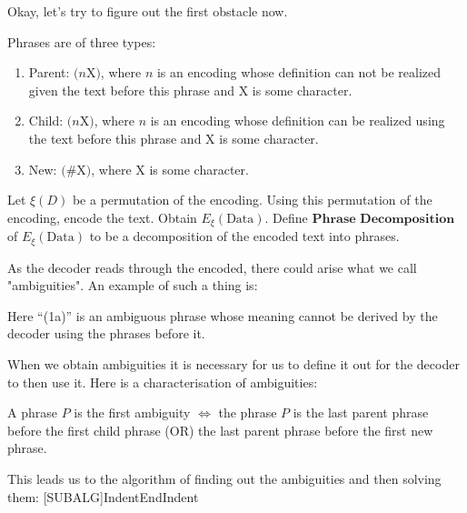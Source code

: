 \documentclass[scrartcl]{article}
\begin{document}
Okay, let's try to figure out the first obstacle now. 
\begin{definition*}[Phrase]
    Phrases are of three types:
    \begin{enumerate}
        \item Parent: $\text{(}n\text{X)}$, where $n$ is an encoding whose definition can not be realized given the text before this phrase and $\text{X}$ is some character.
        \item Child: $\text{(}n\text{X)}$, where $n$ is an encoding whose definition can be realized using the text before this phrase and $\text{X}$ is some character.
        \item New: $\text{(\#X)}$, where $\text{X}$ is some character.
    \end{enumerate}
\end{definition*}
\begin{proposition*}
    Let $\xi(D)$ be a permutation of the encoding. Using this permutation of the encoding, encode the text. Obtain $E_{\xi}(\text{Data})$. Define 
    $\textbf{Phrase Decomposition}$ of $E_{\xi}(\text{Data})$ to be a decomposition of the encoded text into phrases.
\end{proposition*}
\begin{example*}
    \newline
\end{example*}
As the decoder reads through the encoded, there could arise what we call "ambiguities". An example of such a thing is:
\begin{example*}[Ambiguity]
    \newline
    Here ``(1a)'' is an ambiguous phrase whose meaning cannot be derived by the decoder using the phrases before it. 
\end{example*}
When we obtain ambiguities it is necessary for us to define it out for the decoder to then use it. Here is a characterisation of ambiguities:
\begin{theorem*}
    A phrase $P$ is the first ambiguity $\iff$ the phrase $P$ is the last parent phrase before the first child phrase (OR) the last parent phrase before the first new phrase. 
\end{theorem*}
This leads us to the algorithm of finding out the ambiguities and then solving them:
[SUBALG]{Indent}{EndIndent}{}{\algorithmicend\ }%
\end{document}
